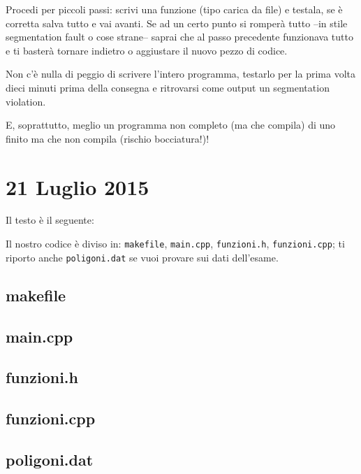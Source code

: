 Procedi per piccoli passi: scrivi una funzione (tipo carica da file) e testala, se è corretta salva tutto e vai avanti. Se ad un certo punto si romperà tutto --in stile segmentation fault o cose strane-- saprai che al passo precedente funzionava tutto e ti basterà tornare indietro o aggiustare il nuovo pezzo di codice. 

Non c'è nulla di peggio di scrivere l'intero programma, testarlo per la prima volta dieci minuti prima della consegna e ritrovarsi come output un segmentation violation.

E, soprattutto, meglio un programma non completo (ma che compila) di uno finito ma che non compila (rischio bocciatura!)!
\newpage
\section{21 Luglio 2015}
Il testo è il seguente:\\
\begin{figure}[ht] 
	\centering
%	
	
\end{figure}  
\newpage

Il nostro codice è diviso in:  \verb|makefile|, \verb|main.cpp|, \verb|funzioni.h|, \verb|funzioni.cpp|; ti riporto anche \verb|poligoni.dat| se vuoi provare sui dati dell'esame.
\subsection*{makefile}

\subsection*{main.cpp}

\subsection*{funzioni.h}

\subsection*{funzioni.cpp}
\subsection*{poligoni.dat}

